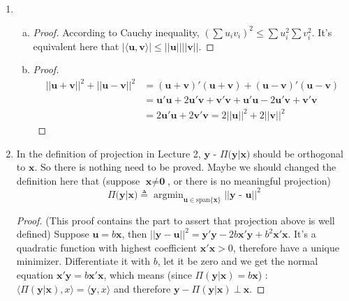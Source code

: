 \documentclass[12pt]{article}
\DeclareMathOperator*{\argmin}{argmin}
\begin{document}
\begin{enumerate}
\begin{proof}
        Now we get $W^\bot = V$, hence dim$(W^\bot) = n-k$. Also we can see that $W^\bot$ is unique. 
        If not, we can merge the two different $W^\bot$ and get a higher dimensional subspace $Z$ that is orthogonal to $W$.
        Then $Z \oplus W \subset \mathbb{R}^n$ but dim$(Z \oplus W) \ge n+1 > n$, a contradiction. 
    \end{proof}
    \item
    \begin{enumerate}[(a)]
        \item 
        \begin{proof}
            According to Cauchy inequality, $\left(\sum u_i v_i\right)^2 \le \sum u_i^2 \sum v_i^2$. It's equivalent here that $|\langle \textbf{u}, \textbf{v} \rangle| \le ||\textbf{u}|| ||\textbf{v}||$.
        \end{proof}
        \item
        \begin{proof}
            \begin{align}
                ||\textbf{u} + \textbf{v}||^2 + ||\textbf{u} - \textbf{v}||^2 &= (\textbf{u} + \textbf{v})'(\textbf{u} + \textbf{v}) + (\textbf{u} - \textbf{v})'(\textbf{u} - \textbf{v}) \\
                                                                              &= \textbf{u}'\textbf{u} + 2 \textbf{u}'\textbf{v} + \textbf{v}'\textbf{v} + \textbf{u}'\textbf{u} - 2 \textbf{u}'\textbf{v} + \textbf{v}'\textbf{v} \\
                                                                              &= 2 \textbf{u}'\textbf{u} + 2 \textbf{v}'\textbf{v} = 2 ||\textbf{u}||^2 + 2 ||\textbf{v}||^2
            \end{align}
        \end{proof}
    \end{enumerate}
    \item
    In the definition of projection in Lecture 2, $\textbf{y - $\Pi$(y|x)}$ should be orthogonal to $\textbf{x}$. So there is nothing need to be proved. 
    Maybe we should changed the definition here that (suppose $\textbf{x} \neq \textbf{0}$, or there is no meaningful projection)
    $$\Pi\textbf{(y|x)} \triangleq \argmin_{\textbf{u} \in \text{span}\{\textbf{x}\}} ||\textbf{y - u}||^2$$
    \begin{proof}
        (This proof contains the part to assert that projection above is well defined)
        Suppose $\textbf{u} = b \textbf{x}$, then $||\textbf{y} - \textbf{u}||^2 = \textbf{y}'\textbf{y} - 2 b \textbf{x}'\textbf{y} + b^2 \textbf{x}'\textbf{x}$.
        It's a quadratic function with highest coefficient $\textbf{x}'\textbf{x} > 0$, therefore have a unique minimizer.
        Differentiate it with $b$, let it be zero and we get the normal equation $\textbf{x}'\textbf{y} = b \textbf{x}'\textbf{x}$,
        which means (since $\Pi(\textbf{y|x}) = b \textbf{x}$) : $\langle \Pi(\textbf{y|x}), x \rangle = \langle \textbf{y}, x \rangle$ and therefore $\textbf{y} - \Pi(\textbf{y|x}) \  \bot \ \textbf{x}$.
    \end{proof}
\end{enumerate}
\end{document}
